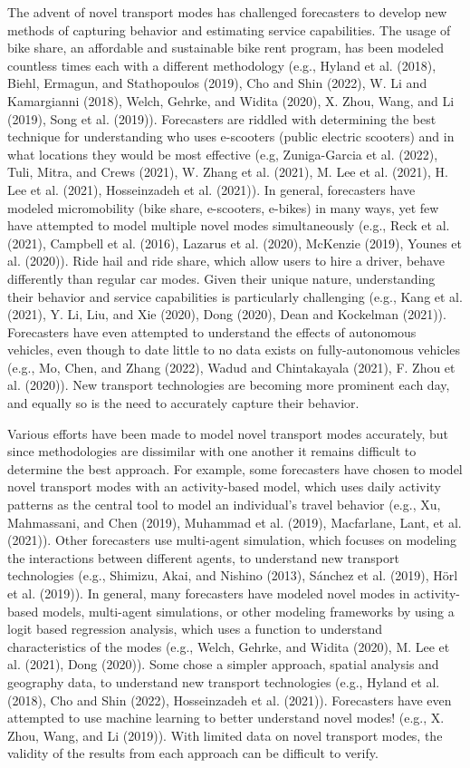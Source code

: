 \documentclass[12pt, oneside, openright]{byuthesis}
\begin{document}
The advent of novel transport modes has challenged forecasters to develop new methods of capturing behavior and estimating service capabilities. The usage of bike share, an affordable and sustainable bike rent program, has been modeled countless times each with a different methodology (e.g., Hyland et al. (2018), Biehl, Ermagun, and Stathopoulos (2019), Cho and Shin (2022), W. Li and Kamargianni (2018), Welch, Gehrke, and Widita (2020), X. Zhou, Wang, and Li (2019), Song et al. (2019)). Forecasters are riddled with determining the best technique for understanding who uses e-scooters (public electric scooters) and in what locations they would be most effective (e.g, Zuniga-Garcia et al. (2022), Tuli, Mitra, and Crews (2021), W. Zhang et al. (2021), M. Lee et al. (2021), H. Lee et al. (2021), Hosseinzadeh et al. (2021)). In general, forecasters have modeled micromobility (bike share, e-scooters, e-bikes) in many ways, yet few have attempted to model multiple novel modes simultaneously (e.g., Reck et al. (2021), Campbell et al. (2016), Lazarus et al. (2020), McKenzie (2019), Younes et al. (2020)). Ride hail and ride share, which allow users to hire a driver, behave differently than regular car modes. Given their unique nature, understanding their behavior and service capabilities is particularly challenging (e.g., Kang et al. (2021), Y. Li, Liu, and Xie (2020), Dong (2020), Dean and Kockelman (2021)). Forecasters have even attempted to understand the effects of autonomous vehicles, even though to date little to no data exists on fully-autonomous vehicles (e.g., Mo, Chen, and Zhang (2022), Wadud and Chintakayala (2021), F. Zhou et al. (2020)). New transport technologies are becoming more prominent each day, and equally so is the need to accurately capture their behavior.

Various efforts have been made to model novel transport modes accurately, but since methodologies are dissimilar with one another it remains difficult to determine the best approach. For example, some forecasters have chosen to model novel transport modes with an activity-based model, which uses daily activity patterns as the central tool to model an individual's travel behavior (e.g., Xu, Mahmassani, and Chen (2019), Muhammad et al. (2019), Macfarlane, Lant, et al. (2021)). Other forecasters use multi-agent simulation, which focuses on modeling the interactions between different agents, to understand new transport technologies (e.g., Shimizu, Akai, and Nishino (2013), Sánchez et al. (2019), Hörl et al. (2019)). In general, many forecasters have modeled novel modes in activity-based models, multi-agent simulations, or other modeling frameworks by using a logit based regression analysis, which uses a function to understand characteristics of the modes (e.g., Welch, Gehrke, and Widita (2020), M. Lee et al. (2021), Dong (2020)). Some chose a simpler approach, spatial analysis and geography data, to understand new transport technologies (e.g., Hyland et al. (2018), Cho and Shin (2022), Hosseinzadeh et al. (2021)). Forecasters have even attempted to use machine learning to better understand novel modes! (e.g., X. Zhou, Wang, and Li (2019)). With limited data on novel transport modes, the validity of the results from each approach can be difficult to verify.
\end{document}
